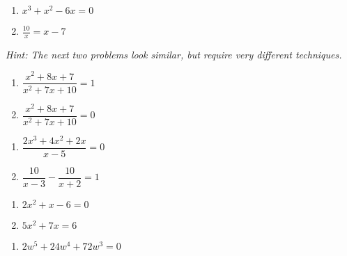 \documentclass[11pt]{article}
\newcommand{\ds}{\displaystyle}
\begin{document}
\newpage
\begin{multicols}{2}
\begin{enumerate}
\setcounter{enumi}{\theenumCount}
\item $x^3+x^2 - 6x = 0$ 
\item $\ds \frac{10}{x} = x-7$ 
\setcounter{enumCount}{\theenumi}
\end{enumerate}
\end{multicols}
\vfill

\noindent
\textit{Hint: The next two problems look similar, but require very different techniques.} 
\begin{multicols}{2}
\begin{enumerate}
\setcounter{enumi}{\theenumCount}
\item $\dfrac{x^2+8x+7}{x^2+7x+10} = 1$ 
\item $\dfrac{x^2+8x+7}{x^2+7x+10} = 0$ 
\setcounter{enumCount}{\theenumi}
\end{enumerate}
\end{multicols}
\vfill


\begin{multicols}{2}
\begin{enumerate}
\setcounter{enumi}{\theenumCount}
\item $\dfrac{2x^3 + 4x^2 + 2x}{x-5} = 0$
\item $\dfrac{10}{x-3} - \dfrac{10}{x+2} = 1$
\setcounter{enumCount}{\theenumi}
\end{enumerate}
\end{multicols}
\vfill

\begin{multicols}{2}
\begin{enumerate}
\setcounter{enumi}{\theenumCount}
\item $2x^2+x-6 = 0$
\item $5x^2 + 7x= 6$
\setcounter{enumCount}{\theenumi}
\end{enumerate}
\end{multicols}
\vfill


\begin{multicols}{2}
\begin{enumerate}
\setcounter{enumi}{\theenumCount}
\item $2w^5 + 24 w^4 + 72 w^3 = 0$
\setcounter{enumCount}{\theenumi}
\end{enumerate}
\end{multicols}
\vfill
\end{document}
